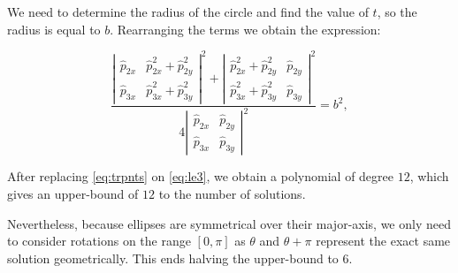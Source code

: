 We need to determine the radius of the circle and find the value of $t$, so the radius is equal to $b$. Rearranging the terms we obtain the expression:

\begin{equation}\label{eq:le3}
\dfrac{\left|
	\begin{array}{cc}
	\hat{p}_{2x}& \hat{p}_{2x}^2+\hat{p}_{2y}^2\\
	\hat{p}_{3x}& \hat{p}_{3x}^2+\hat{p}_{3y}^2
	\end{array}\right|^2
+\left|
\begin{array}{cc}
\hat{p}_{2x}^2+\hat{p}_{2y}^2& \hat{p}_{2y}\\
\hat{p}_{3x}^2+\hat{p}_{3y}^2& \hat{p}_{3y}
\end{array}\right|^2
}{4\left|
\begin{array}{cc}
\hat{p}_{2x}& \hat{p}_{2y}\\
\hat{p}_{3x}& \hat{p}_{3y}
\end{array}\right|^2} = b^2,
\end{equation}

After replacing \autoref{eq:trpnts} on \autoref{eq:le3}, we obtain a polynomial of degree $12$, which gives an upper-bound of $12$ to the number of solutions.

Nevertheless, because ellipses are symmetrical over their major-axis, we only need to consider rotations on the range $[0, \pi]$ as $\theta$ and $\theta+\pi$ represent the exact same solution geometrically. This ends halving the upper-bound to $6$.